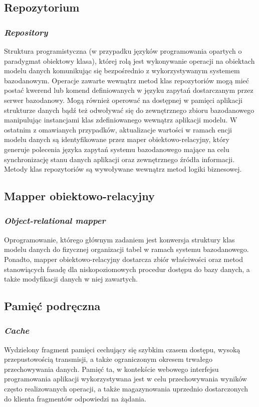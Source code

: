 \subsection*{Repozytorium}
\subsubsection{\textit{Repository}}
Struktura programistyczna (w przypadku języków programowania opartych o paradygmat obiektowy klasa), której rolą jest wykonywanie operacji na obiektach modelu danych komunikując się bezpośrednio z wykorzystywanym systemem bazodanowym. Operacje zawarte wewnątrz metod klas repozytoriów mogą mieć postać kwerend lub komend definiowanych w języku zapytań dostarczanym przez serwer bazodanowy. Mogą również operować na dostępnej w pamięci aplikacji strukturze danych bądź też odwoływać się do zewnętrznego zbioru bazodanowego manipulując instancjami klas zdefiniowanego wewnątrz aplikacji modelu. W ostatnim z omawianych przypadków, aktualizacje wartości w ramach encji modelu danych są identyfikowane przez maper obiektowo-relacyjny, który generuje polecenia języka zapytań systemu bazodanowego mające na celu synchronizację stanu danych aplikacji oraz zewnętrznego źródła informacji. Metody klas repozytoriów są wywoływane wewnątrz metod logiki biznesowej.

\subsection*{Mapper obiektowo-relacyjny}
\subsubsection{\textit{Object-relational mapper}}
Oprogramowanie, którego głównym zadaniem jest konwersja struktury klas modelu danych do fizycznej organizacji tabel w ramach systemu bazodanowego. Ponadto, mapper obiektowo-relacyjny dostarcza zbiór właściwości oraz metod stanowiących fasadę dla niskopoziomowych procedur dostępu do bazy danych, a także modyfikacji danych w niej zawartych.

\subsection*{Pamięć podręczna}
\subsubsection{\textit{Cache}}
Wydzielony fragment pamięci cechujący się szybkim czasem dostępu, wysoką przepustowością transmisji, a także ograniczonym okresem trwałego przechowywania danych. Pamięć ta, w kontekście webowego interfejsu programowania aplikacji wykorzystywana jest w celu przechowywania wyników często realizowanych operacji, a także magazynowania uprzednio dostarczonych do klienta fragmentów odpowiedzi na żądania.


